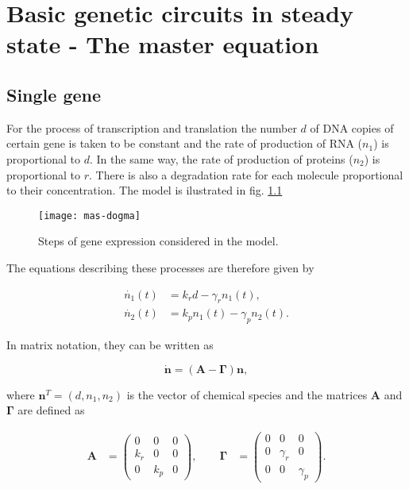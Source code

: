 \chapter{Basic genetic circuits in steady state - The master equation}
\label{ch:master}
\section{Single gene}

For the process of transcription and translation the number $d$ of DNA copies of certain gene is taken to be constant and the rate of production of RNA ($n_1$) is proportional to $d$. In the same way, the rate of production of proteins ($n_2$) is proportional to $r$. There is also a degradation rate for each molecule proportional to their concentration. The model is ilustrated in fig. \ref{fig:mas-dogma}

\begin{figure}[H]
  \centering
  \texttt{[image: mas-dogma]}
  \caption[Model of gene expression for a single gene]{\label{fig:mas-dogma} Steps of gene expression considered in the model.}
\end{figure}

The equations describing these processes are therefore given by

\begin{align}
  \dot{n_1}(t) &= k_rd-\gamma_rn_1(t), \label{eq:1}\\
  \dot{n_2}(t) &= k_pn_1(t)-\gamma_pn_2(t). \label{eq:2}
\end{align}

In matrix notation, they can be written as

\begin{equation}
  \label{eq:matdet}
  \mathbf{\dot{n}} = \left( \mathbf{A} - \mathbf{\Gamma} \right) \mathbf{n},
\end{equation}

where $\mathbf{n}^T=(d,n_1,n_2)$ is the vector of chemical species and the matrices $\mathbf{A}$ and $\mathbf{\Gamma}$ are defined as

\begin{eqnarray}
  \mathbf{A} &=
  \begin{pmatrix}
    0 & 0 & 0 \\
    k_r & 0 & 0 \\
    0 & k_p & 0
  \end{pmatrix},\quad \quad
  \mathbf{\Gamma} &=
  \begin{pmatrix}
    0 & 0 & 0 \\
    0 & \gamma_r & 0 \\
    0 & 0 & \gamma_p
  \end{pmatrix}.
\end{eqnarray}

